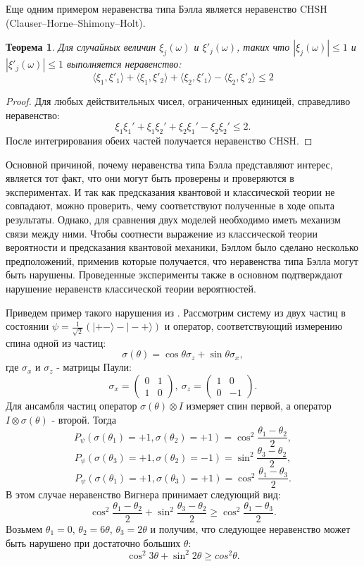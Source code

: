 \documentclass[%
master,         %
subf,           %
href,           %
colorlinks=true %
]{disser}
\numberwithin{equation}{section}
\numberwithin{figure}{section}
\newtheorem{theorem}{Теорема}[section]
\begin{document}
Еще одним примером неравенства типа Бэлла является неравенство CHSH
(Clauser–Horne–Shimony–Holt).
\begin{theorem}
Для случайных величин $\xi_j(\omega)$ и $\xi'_j(\omega)$, таких что $|\xi_j(\omega)| \leq 1$ и $|\xi'_j(\omega)| \leq 1$ выполняется неравенство:
\[
\langle\xi_1,\xi'_1\rangle + \langle\xi_1,\xi'_2\rangle + \langle\xi_2,\xi'_1\rangle -  \langle\xi_2,\xi'_2\rangle \leq 2
\]
\end{theorem}

\begin{proof}
Для любых действительных чисел, ограниченных единицей, справедливо неравенство:
\[
\xi_1\xi_1' + \xi_1\xi_2' + \xi_2\xi_1' - \xi_2\xi_2' \leq 2.
\]
После интегрирования обеих частей получается неравенство CHSH.
\end{proof}

Основной причиной, почему неравенства типа Бэлла представляют интерес, является тот факт, что они могут быть проверены и проверяются в экспериментах. И так как предсказания квантовой и классической теории не совпадают, можно проверить, чему соответствуют полученные в ходе опыта результаты. Однако, для сравнения двух моделей необходимо иметь механизм связи между ними. Чтобы соотнести выражение из классической теории вероятности и предсказания квантовой механики, Бэллом было сделано несколько предположений, применив которые получается, что неравенства типа Бэлла могут быть нарушены. Проведенные эксперименты также в основном подтверждают нарушение неравенств классической теории вероятностей.

Приведем пример такого нарушения из \cite{Khrennikov_information}. Рассмотрим систему из двух частиц в состоянии $\psi = \frac{1}{\sqrt{2}}(|+-\rangle - |-+\rangle)$ и оператор, соответствующий измерению спина одной из частиц:
\[
\sigma(\theta) = \cos\theta\sigma_z + \sin\theta\sigma_x,
\] 
где $\sigma_x$ и $\sigma_z$ - матрицы Паули:
\[
\sigma_x = 
\begin{pmatrix}
0 & 1\\
1 & 0
\end{pmatrix},\ \sigma_z = 
\begin{pmatrix}
1 & 0\\
0 & -1
\end{pmatrix}.
\]
Для ансамбля частиц оператор $\sigma(\theta) \otimes I$ измеряет спин первой, а оператор $I \otimes \sigma(\theta)$ - второй.
Тогда
\[
P_\psi(\sigma(\theta_1) = + 1, \sigma(\theta_2) = +1) = \cos^2\frac{\theta_1 - \theta_2}{2},
\]
\[
P_\psi(\sigma(\theta_3) = + 1, \sigma(\theta_2) = -1) = \sin^2\frac{\theta_3 - \theta_2}{2},
\]
\[
P_\psi(\sigma(\theta_1) = + 1, \sigma(\theta_3) = +1) = \cos^2\frac{\theta_1 - \theta_3}{2}.
\]
В этом случае неравенство Вигнера принимает следующий вид:
\[
\cos^2\frac{\theta_1 - \theta_2}{2} + \sin^2\frac{\theta_3 - \theta_2}{2} \geq  \cos^2\frac{\theta_1 - \theta_3}{2}.
\]
Возьмем $\theta_1 = 0$, $\theta_2 = 6\theta$, $\theta_3 = 2\theta$ и получим, что следующее неравенство может быть нарушено при достаточно больших $\theta$:
\[
\cos^2 3\theta + \sin^2 2\theta \geq cos^2 \theta.
\]
\end{document}
